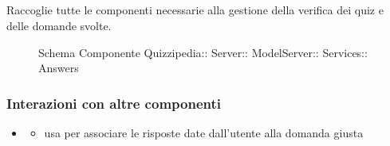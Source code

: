 \subsection{}
Raccoglie tutte le componenti necessarie alla gestione della verifica dei quiz e delle domande svolte.
\begin{figure}[H]
\centering
\noindent{}
\caption[Schema Componente Answers]{Schema Componente Quizzipedia:: Server:: ModelServer:: Services:: Answers}
\end{figure}
\subsubsection{Interazioni con altre componenti}
\begin{itemize}
\item {}
\begin{itemize}
\item usa  per associare le risposte date dall'utente alla domanda giusta
\end{itemize}
\end{itemize}
